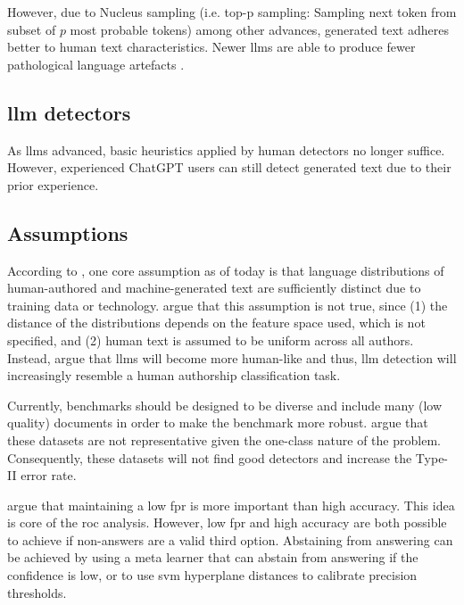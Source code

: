 However, due to Nucleus sampling (i.e. top-p sampling: Sampling next token from subset of $p$ most probable tokens) 
among other advances, generated text adheres better to human text characteristics.
Newer \acp{llm} are able to produce fewer pathological language artefacts \citep{llm_detection_av_2025}.

\subsection{\ac{llm} detectors}

As \acp{llm} advanced, basic heuristics applied by human detectors no longer suffice.
However, experienced ChatGPT users can still detect generated text due to their prior experience.

\subsection{Assumptions}

According to \citet{llm_detection_av_2025}, one core assumption as of today is that 
language distributions of human-authored and machine-generated text are sufficiently distinct due to training data or technology.
\citet{llm_detection_av_2025} argue that this assumption is not true, since 
(1) the distance of the distributions depends on the feature space used, which is not specified, and
(2) human text is assumed to be uniform across all authors.
Instead, \citet{llm_detection_av_2025} argue that \acp{llm} will become more human-like and thus, 
\ac{llm} detection will increasingly resemble a human authorship classification task.

Currently, benchmarks should be designed to be diverse and include many (low quality) documents in order to make the benchmark more robust.
\citet{llm_detection_av_2025} argue that these datasets are not representative given the one-class nature of the problem.
Consequently, these datasets will not find good detectors and increase the Type-II error rate.

\citet{llm_detection_av_2025} argue that maintaining a low \ac{fpr} is more important than high accuracy.
This idea is core of the \ac{roc} analysis.
However, low \ac{fpr} and high accuracy are both possible to achieve if non-answers are a valid third option.
Abstaining from answering can be achieved by using a meta learner that can abstain from answering if the confidence is low, 
or to use \ac{svm} hyperplane distances to calibrate precision thresholds.

